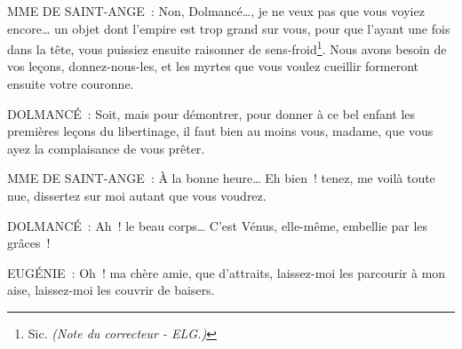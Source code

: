\documentclass[french,twoside]{book} %
\def\mednobreak{\ifdim\lastskip<\medskipamount
  \removelastskip\nopagebreak\medskip\fi}
\newcommand{\labelblock}[1]{\medbreak{\noindent\color{rubric}\bfseries #1}\par\mednobreak}
\begin{document}
MME DE SAINT-ANGE : Non, Dolmancé…, je ne veux pas que vous voyiez encore… un objet dont l’empire est trop grand sur vous, pour que l’ayant une fois dans la tête, vous puissiez ensuite raisonner de sens-froid\footnote{ Sic. {\itshape (Note du correcteur - ELG.)}}. Nous avons besoin de vos leçons, donnez-nous-les, et les myrtes que vous voulez cueillir formeront ensuite votre couronne.\par
DOLMANCÉ : Soit, mais pour démontrer, pour donner à ce bel enfant les premières leçons du libertinage, il faut bien au moins vous, madame, que vous ayez la complaisance de vous prêter.\par
MME DE SAINT-ANGE : À la bonne heure… Eh bien ! tenez, me voilà toute nue, dissertez sur moi autant que vous voudrez.\par
DOLMANCÉ : Ah ! le beau corps… C’est Vénus, elle-même, embellie par les grâces !\par
EUGÉNIE : Oh ! ma chère amie, que d’attraits, laissez-moi les parcourir à mon aise, laissez-moi les couvrir de baisers.\par

\labelblock{Elle exécute.}
\end{document}
